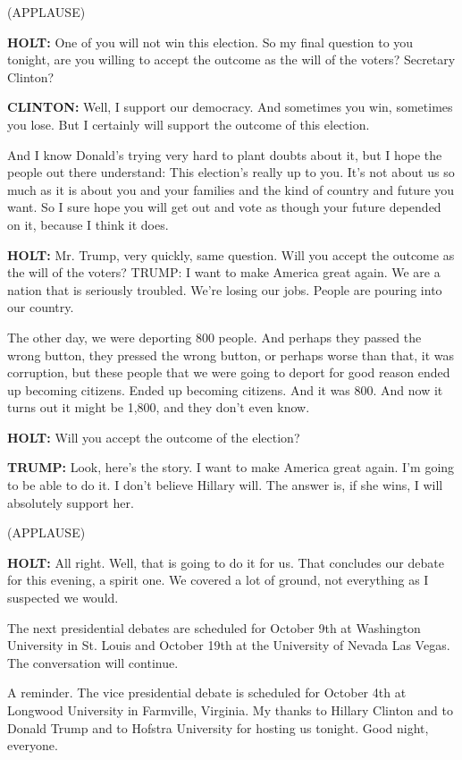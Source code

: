 (APPLAUSE)

\textbf{HOLT:} One of you will not win this election. So my final
question to you tonight, are you willing to accept the outcome as the
will of the voters? Secretary Clinton?

\textbf{CLINTON:} Well, I support our democracy. And sometimes you win,
sometimes you lose. But I certainly will support the outcome of this
election.

And I know Donald's trying very hard to plant doubts about it, but I
hope the people out there understand: This election's really up to you.
It's not about us so much as it is about you and your families and the
kind of country and future you want. So I sure hope you will get out and
vote as though your future depended on it, because I think it does.

\textbf{HOLT:} Mr. Trump, very quickly, same question. Will you accept
the outcome as the will of the voters? TRUMP: I want to make America
great again. We are a nation that is seriously troubled. We're losing
our jobs. People are pouring into our country.

The other day, we were deporting 800 people. And perhaps they passed the
wrong button, they pressed the wrong button, or perhaps worse than that,
it was corruption, but these people that we were going to deport for
good reason ended up becoming citizens. Ended up becoming citizens. And
it was 800. And now it turns out it might be 1,800, and they don't even
know.

\textbf{HOLT:} Will you accept the outcome of the election?

\textbf{TRUMP:} Look, here's the story. I want to make America great
again. I'm going to be able to do it. I don't believe Hillary will. The
answer is, if she wins, I will absolutely support her.

(APPLAUSE)

\textbf{HOLT:} All right. Well, that is going to do it for us. That
concludes our debate for this evening, a spirit one. We covered a lot of
ground, not everything as I suspected we would.

The next presidential debates are scheduled for October 9th at
Washington University in St. Louis and October 19th at the University of
Nevada Las Vegas. The conversation will continue.

A reminder. The vice presidential debate is scheduled for October 4th at
Longwood University in Farmville, Virginia. My thanks to Hillary Clinton
and to Donald Trump and to Hofstra University for hosting us tonight.
Good night, everyone.


